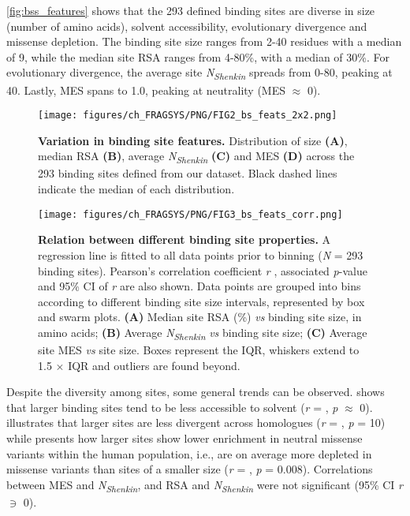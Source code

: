 {\autoref{fig:bss_features} shows that the 293 defined binding sites are diverse in size (number of amino acids), solvent accessibility, evolutionary divergence and missense depletion. The binding site size ranges from 2-40 residues with a median of 9, while the median site RSA ranges from 4-80\%, with a median of 30\%. For evolutionary divergence, the average site \textit{N\textsubscript{Shenkin}} spreads from 0-80, peaking at 40. Lastly, MES spans  to 1.0, peaking at neutrality (MES $\approx$ 0).

\begin{figure}[htb!]
    \centering
    \texttt{[image: figures/ch\_FRAGSYS/PNG/FIG2\_bs\_feats\_2x2.png]}
    \caption[Variation in binding site features]{\textbf{Variation in binding site features.} Distribution of size \textbf{(A)}, median RSA \textbf{(B)}, average \textit{N\textsubscript{Shenkin}} \textbf{(C)} and MES \textbf{(D)} across the 293 binding sites defined from our dataset. Black dashed lines indicate the median of each distribution.}
    \label{fig:bss_features}
\end{figure}

\begin{figure}[htb!]
    \centering
    \texttt{[image: figures/ch\_FRAGSYS/PNG/FIG3\_bs\_feats\_corr.png]}
    \caption[Relation between different binding site properties]{\textbf{Relation between different binding site properties.} A regression line is fitted to all data points prior to binning (\textit{N} = 293 binding sites). Pearson’s correlation coefficient \textit{r} \cite{RODGERS_1988_CORRELATION}, associated \textit{p}-value and 95\% CI of \textit{r} \cite{BOWLEY_1928_R_CI} are also shown. Data points are grouped into bins according to different binding site size intervals, represented by box and swarm plots. \textbf{(A)} Median site RSA (\%) \textit{vs} binding site size, in amino acids; \textbf{(B)} Average \textit{N\textsubscript{Shenkin}} \textit{vs} binding site size; \textbf{(C)} Average site MES \textit{vs} site size. Boxes represent the IQR, whiskers extend to 1.5 $\times$ IQR and outliers are found beyond.}
    \label{fig:bss_feats_corr}
\end{figure}

\newpage

Despite the diversity among sites, some general trends can be observed.  shows that larger binding sites tend to be less accessible to solvent (\textit{r} = , \textit{p} $\approx$ 0).  illustrates that larger sites are less divergent across homologues (\textit{r} = , \textit{p} = 10\textsuperscript{}) while  presents how larger sites show lower enrichment in neutral missense variants within the human population, i.e., are on average more depleted in missense variants than sites of a smaller size (\textit{r} = , \textit{p} = 0.008). Correlations between MES and \textit{N\textsubscript{Shenkin}}, and RSA and \textit{N\textsubscript{Shenkin}} were not significant (95\% CI \textit{r} $\ni$ 0).

}
